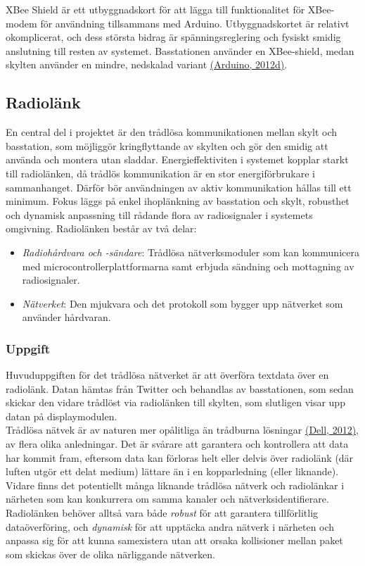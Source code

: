 \documentclass[a4paper,11pt]{article}
\begin{document}
XBee Shield är ett utbyggnadskort för att lägga till funktionalitet för XBee-modem för användning tillsammans med Arduino. Utbyggnadskortet är relativt okomplicerat, och dess största bidrag är spänningsreglering och fysiskt smidig anslutning till resten av systemet. Basstationen använder en XBee-shield, medan skylten använder en mindre, nedskalad variant \hyperref[arduino]{(Arduino, 2012d)}.

\subsection{Radiolänk}
En central del i projektet är den trådlösa kommunikationen mellan skylt och basstation, som möjliggör kringflyttande av skylten och gör den smidig att använda och montera utan sladdar. Energieffektiviten i systemet kopplar starkt till radiolänken, då trådlös kommunikation är en stor energiförbrukare i sammanhanget. Därför bör användningen av aktiv kommunikation hållas till ett minimum. Fokus läggs på enkel ihoplänkning av basstation och skylt, robusthet och dynamisk anpassning till rådande flora av radiosignaler i systemets omgivning. Radiolänken består av två delar:
	
	\begin{itemize}
	\item {\it Radiohårdvara och -sändare}: Trådlösa nätverksmoduler som kan kommunicera med microcontrollerplattformarna samt erbjuda sändning och mottagning av radiosignaler.
    	\item {\it Nätverket}: Den mjukvara och det protokoll som bygger upp nätverket som använder hårdvaran.
	\end{itemize}
	
\subsubsection{Uppgift}
Huvuduppgiften för det trådlösa nätverket är att överföra textdata över en radiolänk. Datan hämtas från Twitter och behandlas av basstationen, som sedan skickar den vidare trådlöst via radiolänken till skylten, som slutligen visar upp datan på displaymodulen. \\

Trådlösa nätvek är av naturen mer opålitliga än trådburna lösningar \hyperref[dell]{(Dell, 2012)}, av flera olika anledningar. Det är svårare att garantera och kontrollera att data har kommit fram, eftersom data kan förloras helt eller delvis över radiolänk (där luften utgör ett delat medium) lättare än i en kopparledning (eller liknande). Vidare finns det potentiellt många liknande trådlösa nätverk och radiolänkar i närheten som kan konkurrera om samma kanaler och nätverksidentifierare. Radiolänken behöver alltså vara både {\it robust} för att garantera tillförlitlig dataöverföring, och {\it dynamisk} för att upptäcka andra nätverk i närheten och anpassa sig för att kunna samexistera utan att orsaka kollisioner mellan paket som skickas över de olika närliggande nätverken. \\
\end{document}

